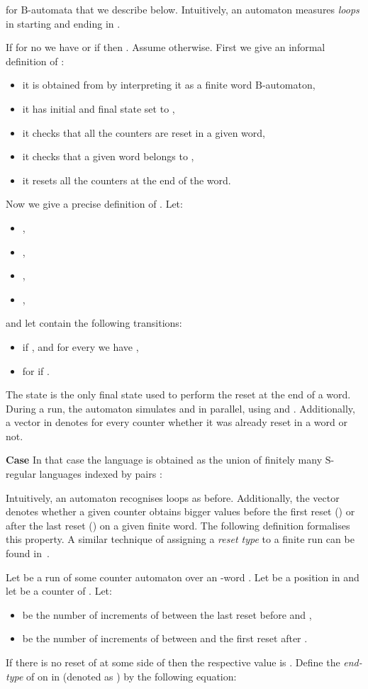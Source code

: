 \documentclass{LMCS}
\newcommand{\fB}{\ensuremath{\mathrm{B}}\xspace}
\newcommand{\fS}{\ensuremath{\mathrm{S}}\xspace}
\begin{document}
for \fB-automata  that we describe below. Intuitively, an automaton  measures \emph{loops} in  starting and ending in .

If for no  we have  or if  then . Assume otherwise. First we give an informal definition of :
\begin{itemize}
\item it is obtained from  by interpreting it as a finite word \fB-automaton,
\item it has initial and final state set to ,
\item it checks that all the counters are reset in a given word,
\item it checks that a given word belongs to ,
\item it resets all the counters at the end of the word.
\end{itemize}

Now we give a precise definition of . 
Let:
\begin{itemize}
\item ,
\item ,
\item ,
\item ,
\end{itemize}
and let  contain the following transitions:
\begin{itemize}
\item  if ,  and for every  we have ,
\item  for  if .
\end{itemize}

The state  is the only final state used to perform the reset at the end of a word. During a run, the automaton  simulates  and  in parallel, using  and . Additionally, a vector in  denotes for every counter whether it was already reset in a word or not.

{\bf Case } In that case the language  is obtained as the union of finitely many \fS-regular languages indexed by pairs :

Intuitively, an automaton  recognises loops  as before. Additionally, the vector  denotes whether a given counter  obtains bigger values before the first reset () or after the last reset () on a given finite word. The following definition formalises this property. A similar technique of assigning a \emph{reset type} to a finite run can be found in~\cite{bojanczyk_bounds}.

\begin{definition}\label{def:etype}
Let  be a run of some counter automaton  over an -word . Let  be a position in  and let  be a counter of . Let:

\begin{itemize}
\item  be the number of increments of  between the last reset before  and ,
\item  be the number of increments of  between  and the first reset after .
\end{itemize}
If there is no reset of  at some side of  then the respective value is . Define the \emph{end-type} of  on  in  (denoted as ) by the following equation:


\end{definition}
\end{document}
